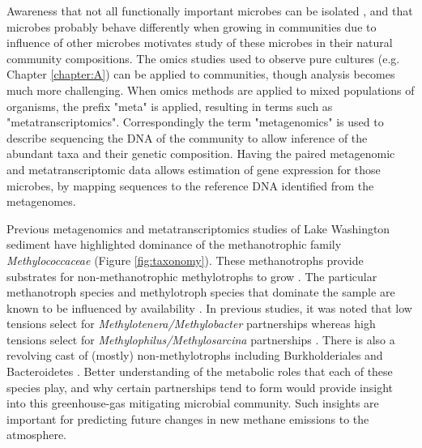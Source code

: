 Awareness that not all functionally important microbes can be isolated \cite{kaeberlein2002, stewart2012}, and that microbes probably behave differently when growing in communities due to influence of other microbes \cite{yu2016synthetic} motivates study of these microbes in their natural community compositions.
The omics studies used to observe pure cultures (e.g. Chapter \ref{chapter:A}) can be applied to communities, though analysis becomes much more challenging.
When omics methods are applied to mixed populations of organisms, the prefix "meta" is applied, resulting in terms such as  "metatranscriptomics".
Correspondingly the term "metagenomics" is used to describe sequencing the DNA of the community to allow inference of the abundant taxa and their genetic composition.
Having the paired metagenomic and metatranscriptomic data allows estimation of gene expression for those microbes, by mapping sequences to the reference DNA identified from the metagenomes.

Previous metagenomics and metatranscriptomics studies of Lake Washington sediment have highlighted dominance of the methanotrophic family \textit{Methylococcaceae} \cite{beck2013LW, beck2014LW, oshkin2015LW, hernandez2015LW} (Figure \ref{fig:taxonomy}).
These methanotrophs provide substrates for non-methanotrophic methylotrophs to grow \cite{beck2013LW}.
The particular methanotroph species and methylotroph species that dominate the sample are known to be influenced by  availability \cite{hernandez2015LW}.
In previous studies, it was noted that low  tensions select for \mbox{\textit{Methylotenera/Methylobacter}} partnerships whereas high  tensions select for  \mbox{\textit{Methylophilus/Methylosarcina}} partnerships \cite{hernandez2015LW}.
There is also a revolving cast of (mostly) non-methylotrophs including Burkholderiales and Bacteroidetes \cite{kalyuzhnaya2008Burkholderiales, beck2014LW}.  %
Better understanding of the metabolic roles that each of these species play, and why certain partnerships tend to form would provide insight into this greenhouse-gas mitigating microbial community.
Such insights are important for predicting future changes in new methane emissions to the atmosphere.

